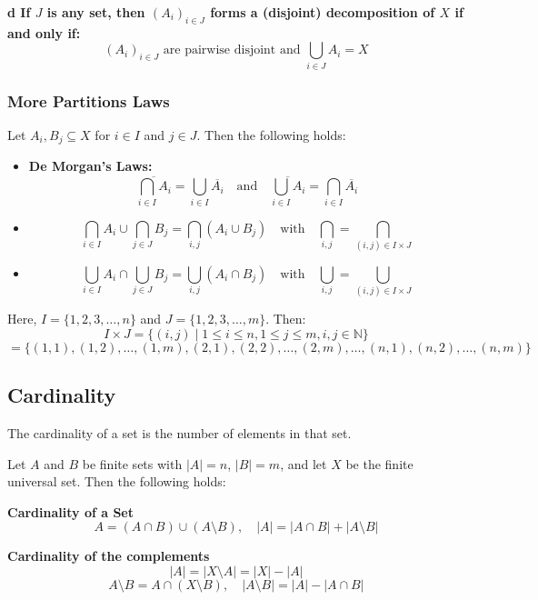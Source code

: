 \textbf{d If \( J \) is any set, then \( (A_i)_{i \in J} \) forms a (disjoint) decomposition of \( X \) if and only if:}
\[
	(A_{i})_{i \in J} \text{ are pairwise disjoint and } \bigcup_{i \in J} A_i = X
\]

\subsubsection{More Partitions Laws}
Let \( A_i, B_j \subseteq X \) for \( i \in I \) and \( j \in J \). Then the following holds:

\begin{itemize}[label=\(-\)]


	\item\textbf{De Morgan's Laws:}
	\[
		\overline{\bigcap_{i \in I} A_i}= \bigcup_{i \in I} \overline{A_i} \quad \text{and} \quad \overline{\bigcup_{i \in I} A_i} = \bigcap_{i \in I} \overline{A_i}
	\]

	\item\[
		\bigcap_{i \in I} A_i \cup \bigcap_{j \in J} B_j = \bigcap_{i,j} (A_i \cup B_j) \quad \text{with} \quad \bigcap_{i,j} = \bigcap_{(i,j) \in I \times J}
	\]


	\item\[
		\bigcup_{i \in I} A_i \cap \bigcup_{j \in J} B_j = \bigcup_{i,j} (A_i \cap B_j) \quad \text{with} \quad \bigcup_{i,j} = \bigcup_{(i,j) \in I \times J}
	\]

\end{itemize}
Here, \( I = \{ 1, 2, 3, \dots, n \} \) and \( J = \{ 1, 2, 3, \dots, m \} \). Then:
\[
	I \times J = \{ (i, j) \mid 1 \leq i \leq n, 1 \leq j \leq m, i, j \in \mathbb{N} \}
\]
\[
	= \{ (1, 1), (1, 2), \dots, (1, m), (2, 1), (2, 2), \dots, (2, m), \dots, (n, 1), (n, 2), \dots, (n, m) \}
\]

\subsection{Cardinality}
The cardinality of a set is the number of elements in that set.

Let \( A \) and \( B \) be finite sets with \( |A| = n \), \( |B| = m \), and let \( X \) be the finite universal set. Then the following holds:

\textbf{Cardinality of a Set}
\[
	A = (A \cap B) \cup (A \setminus B), \quad |A| = |A \cap B| + |A \setminus B|
\]

\textbf{Cardinality of the complements}
\[
	|A| = |X \setminus A| = |X| - |A|
\]
\[
	A \setminus B = A \cap (X \setminus B), \quad |A \setminus B| = |A| - |A \cap B|
\]

